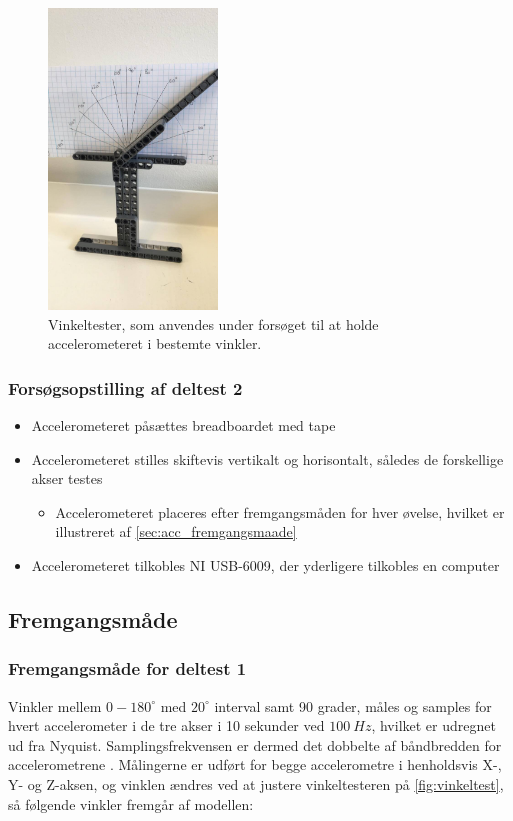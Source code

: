 \begin{figure}[H]
\centering
\includegraphics[width=0.4\textwidth]{figures/vinkeltest}
\caption{Vinkeltester, som anvendes under forsøget til at holde accelerometeret i bestemte vinkler.}
\label{fig:vinkeltest}
\end{figure}

\subsubsection{Forsøgsopstilling af deltest 2}
\begin{itemize}
\item Accelerometeret påsættes breadboardet med tape
\item Accelerometeret stilles skiftevis vertikalt og horisontalt, således de forskellige akser testes
\begin{itemize}
\item Accelerometeret placeres efter fremgangsmåden for hver øvelse, hvilket er illustreret af \autoref{sec:acc_fremgangsmaade}
\end{itemize}
\item Accelerometeret tilkobles NI USB-6009, der yderligere tilkobles en computer
\end{itemize}

\subsection{Fremgangsmåde}  

\subsubsection{Fremgangsmåde for deltest 1} \label{sec:vinkel_fremgangsmaade}
Vinkler mellem $0-180^{\circ}$ med $20^{\circ}$ interval samt 90 grader, måles og samples for hvert accelerometer i de tre akser i 10 sekunder ved $100~Hz$, hvilket er udregnet ud fra Nyquist. Samplingsfrekvensen er dermed det dobbelte af båndbredden for accelerometrene \citep{analogdevices2010}. Målingerne er udført for begge accelerometre i henholdsvis X-, Y- og Z-aksen, og vinklen ændres ved at justere vinkeltesteren på \autoref{fig:vinkeltest}, så følgende vinkler fremgår af modellen:


